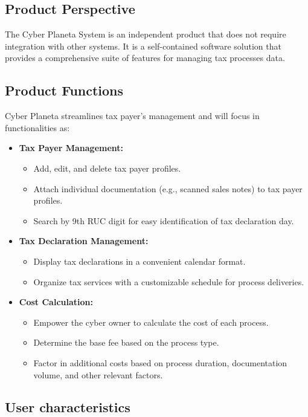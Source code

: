 \documentclass[12pt,a4paper, twosite]{article}
\begin{document}
\subsection{Product Perspective}
\label{sec:org24980a8}

The Cyber Planeta System is an independent product that does not require integration with other systems. It is a self-contained software solution that provides a comprehensive suite of features for managing tax processes data.


\subsection{Product Functions}
\label{sec:orgaf51da6}

Cyber Planeta streamlines tax payer's management and will focus in functionalities as: \begin{itemize}
\item \textbf{Tax Payer Management:}
\begin{itemize}
\item Add, edit, and delete tax payer profiles.
\item Attach individual documentation (e.g., scanned sales notes) to tax payer profiles.
\item Search by 9th RUC digit for easy identification of tax declaration day.
\end{itemize}
\item \textbf{Tax Declaration Management:}
\begin{itemize}
\item Display tax declarations in a convenient calendar format.
\item Organize tax services with a customizable schedule for process deliveries.
\end{itemize}
\item \textbf{Cost Calculation:}
\begin{itemize}
\item Empower the cyber owner to calculate the cost of each process.
\item Determine the base fee based on the process type.
\item Factor in additional costs based on process duration, documentation volume, and other relevant factors.

\end{itemize}
\end{itemize}


\subsection{User characteristics}
\label{sec:orga40b0ee}
\end{document}
